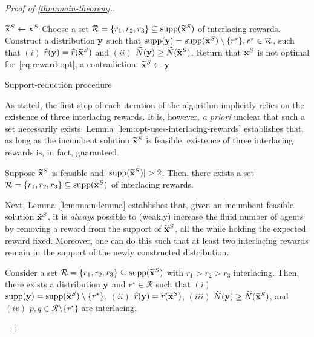 \documentclass[12pt]{article}
\begin{document}
\begin{proof}[Proof of \cref{thm:main-theorem}.]
\begin{algorithm}
\begin{algorithmic}
\State $\widetilde{\mathbf{x}}^S \gets \mathbf{x}^S$
\State Choose a set $\mathcal{R} = \{r_1, r_2, r_3\} \subseteq \text{supp}(\widetilde{\mathbf{x}}^S)$ of interlacing rewards.
\State 
Construct a distribution $\mathbf{y}$ such that $\text{supp}(\mathbf{y}) = \text{supp}(\widetilde{\mathbf{x}}^S) \setminus \{r^\star\}, r^\star\in \mathcal{R}$, such that
\State $(i)$ $\widehat{r}(\mathbf{y}) = \widehat{r}(\widetilde{\mathbf{x}}^S)$ and $(ii)$ $\widetilde{N}(\mathbf{y}) \geq \widetilde{N}(\widetilde{\mathbf{x}}^S)$.
\If{$\fluidn(\by) > \fluidn(\algxvec)$}
\State Return that $\mathbf{x}^S$ is not optimal for~\ref{eq:reward-opt}, a contradiction.
\EndIf
\State $\widetilde{\mathbf{x}}^S \gets \mathbf{y}$
\EndWhile
\end{algorithmic}
	\caption{Support-reduction procedure}\label{alg:support-reduction}
\end{algorithm}

{As stated, the first step of each iteration of the algorithm implicitly relies on the existence of three interlacing rewards. It is, however, \emph{a priori} unclear that such a set necessarily exists. Lemma~\ref{lem:opt-uses-interlacing-rewards} establishes that, as long as the incumbent solution $\widetilde{\mathbf{x}}^S$ is feasible, existence of three interlacing rewards is{,} in fact{,} guaranteed.}
\begin{lemma}\label{lem:opt-uses-interlacing-rewards}
Suppose $\widetilde{\mathbf{x}}^S$ is feasible and $|\text{supp}(\widetilde{\mathbf{x}}^S)| > 2$. Then, there exists a set $\mathcal{R} = \{r_1,r_2,r_3\}\subseteq\text{supp}(\widetilde{\mathbf{x}}^S)$ of interlacing rewards.
\end{lemma}

{{Next, Lemma~\ref{lem:main-lemma}} establishes that, given an incumbent feasible solution $\widetilde{\mathbf{x}}^S$, it is {\it always} possible to (weakly) increase the fluid number of agents by removing a reward from the support of $\widetilde{\mathbf{x}}^S$, all the while holding the expected reward fixed. Moreover, one can do this such that at least two interlacing rewards remain in the support of the newly constructed distribution.}

\begin{lemma}\label{lem:main-lemma}
Consider a set $\mathcal{R} = \{r_1, r_2, r_3\} \subseteq \text{supp}(\widetilde{\mathbf{x}}^S)$ with $r_1 > r_2 > r_3$ interlacing. Then, there exists a distribution $\mathbf{y}$ and $r^\star \in \mathcal{R}$ such that $(i)$ $\text{supp}(\mathbf{y}) = \text{supp}(\widetilde{\mathbf{x}}^S) \setminus \{r^\star\}$, $(ii)$ $\widehat{r}(\mathbf{y}) = \widehat{r}(\widetilde{\mathbf{x}}^S)$, $(iii)$ $\widetilde{N}(\mathbf{y}) \geq \widetilde{N}(\widetilde{\mathbf{x}}^S)$, and $(iv)$ $p, q \in \mathcal{R}\setminus\{r^\star\}$ are interlacing.
\end{lemma}


\end{proof}
\end{document}
